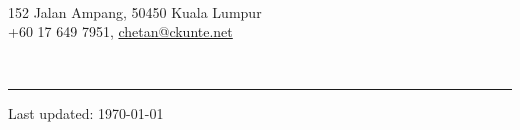 \documentclass[10pt]{article}
\begin{document}
\begin{flushleft}
  \textrm{\LARGE{\theauthor}} \\
  152 Jalan Ampang, 50450 Kuala Lumpur \\
  +60 17 649 7951, \href{mailto:chetan@ckunte.net}{chetan@ckunte.net} \hfill
\end{flushleft}




~\hrule

\begin{multicols}{2}









\end{multicols}

\vfill{}

\begin{center}
  \scriptsize{Last updated: \today}
\end{center}
\end{document}
